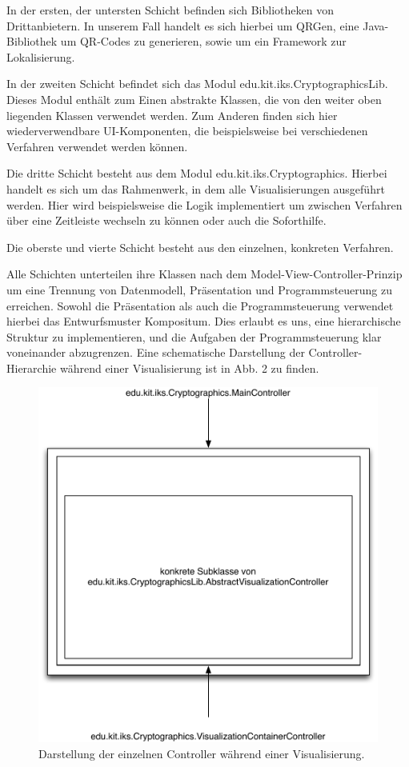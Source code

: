 \documentclass{article}
\begin{document}
In der ersten, der untersten Schicht befinden sich Bibliotheken von Drittanbietern. In unserem Fall handelt es sich hierbei um QRGen, eine Java-Bibliothek um QR-Codes zu generieren, sowie um ein Framework zur Lokalisierung.

In der zweiten Schicht befindet sich das Modul edu.kit.iks.CryptographicsLib. Dieses Modul enthält zum Einen abstrakte Klassen, die von den weiter oben liegenden Klassen verwendet werden. Zum Anderen finden sich hier wiederverwendbare UI-Komponenten, die beispielsweise bei verschiedenen Verfahren verwendet werden können.

Die dritte Schicht besteht aus dem Modul edu.kit.iks.Cryptographics. Hierbei handelt es sich um das Rahmenwerk, in dem alle Visualisierungen ausgeführt werden. Hier wird beispielsweise die Logik implementiert um zwischen Verfahren über eine Zeitleiste wechseln zu können oder auch die Soforthilfe.

Die oberste und vierte Schicht besteht aus den einzelnen, konkreten Verfahren.

Alle Schichten unterteilen ihre Klassen nach dem Model-View-Controller-Prinzip um eine Trennung von Datenmodell, Präsentation und Programmsteuerung zu erreichen. Sowohl die Präsentation als auch die Programmsteuerung verwendet hierbei das Entwurfsmuster Kompositum. Dies erlaubt es uns, eine hierarchische Struktur zu implementieren, und die Aufgaben der Programmsteuerung klar voneinander abzugrenzen. Eine schematische Darstellung der Controller-Hierarchie während einer Visualisierung ist in Abb. 2 zu finden.

\begin{figure}[H]
  \centering
    \includegraphics[width=\textwidth]{resources/architecture-2}
  \caption{Darstellung der einzelnen Controller während einer Visualisierung.}
\end{figure}
\end{document}
